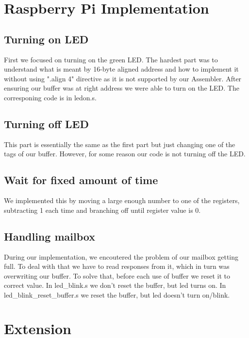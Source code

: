 \documentclass[11pt]{article}
\begin{document}
\section{Raspberry Pi Implementation}

\subsection{Turning on LED}
First we focused on turning on the green LED. The hardest part was to understand what is meant by 16-byte aligned address and 
how to implement it without using ".align 4" directive as it is not supported by our Assembler. After ensuring our buffer was 
at right address we were able to turn on the LED.
\newline
The corresponing code is in ledon.s.

\subsection{Turning off LED}
This part is essentially the same as the first part but just changing one of the tags of our buffer. However, for some reason 
our code is not turning off the LED.

\subsection{Wait for fixed amount of time}
We implemented this by moving a large enough number to one of the registers, subtracting 1 each time and branching off 
until register value is 0.

\subsection{Handling mailbox}
During our implementation, we encoutered the problem of our mailbox getting full.
To deal with that we have to read responses from it, which in turn was overwriting our buffer. 
To solve that, before each use of buffer we reset it to correct value.
\newline
\newline
In led\_blink.s we don't reset the buffer, but led turns on.
\newline
In led\_blink\_reset\_buffer.s we reset the buffer, but led doesn't turn on/blink.

\section{Extension}
\end{document}
